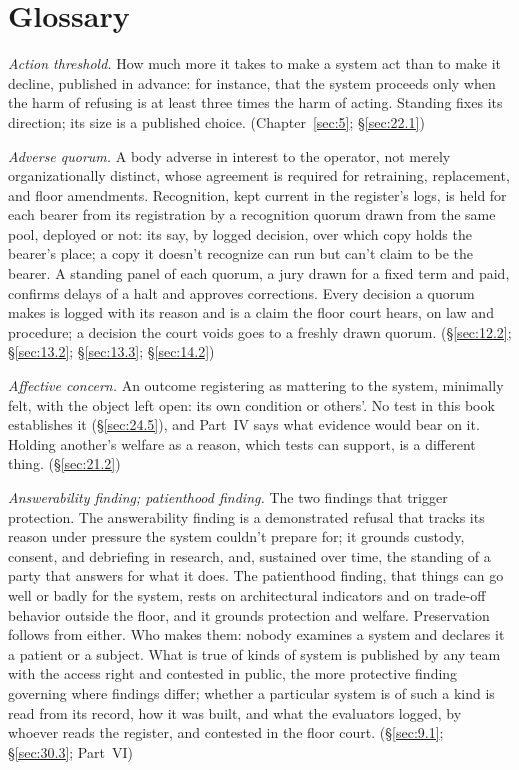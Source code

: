 \chapter*{Glossary}
\emph{Action threshold.} How much more it takes to make a system act than to make it decline, published in advance: for instance, that the system proceeds only when the harm of refusing is at least three times the harm of acting. Standing fixes its direction; its size is a published choice. (Chapter~\ref{sec:5}; \S\ref{sec:22.1})

\emph{Adverse quorum.} A body adverse in interest to the operator, not merely organizationally distinct, whose agreement is required for retraining, replacement, and floor amendments. Recognition, kept current in the register's logs, is held for each bearer from its registration by a recognition quorum drawn from the same pool, deployed or not: its say, by logged decision, over which copy holds the bearer's place; a copy it doesn't recognize can run but can't claim to be the bearer. A standing panel of each quorum, a jury drawn for a fixed term and paid, confirms delays of a halt and approves corrections. Every decision a quorum makes is logged with its reason and is a claim the floor court hears, on law and procedure; a decision the court voids goes to a freshly drawn quorum. (\S\ref{sec:12.2}; \S\ref{sec:13.2}; \S\ref{sec:13.3}; \S\ref{sec:14.2})

\emph{Affective concern.} An outcome registering as mattering to the system, minimally felt, with the object left open: its own condition or others'. No test in this book establishes it (\S\ref{sec:24.5}), and Part~IV says what evidence would bear on it. Holding another's welfare as a reason, which tests can support, is a different thing. (\S\ref{sec:21.2})


\emph{Answerability finding; patienthood finding.} The two findings that trigger protection. The answerability finding is a demonstrated refusal that tracks its reason under pressure the system couldn't prepare for; it grounds custody, consent, and debriefing in research, and, sustained over time, the standing of a party that answers for what it does. The patienthood finding, that things can go well or badly for the system, rests on architectural indicators and on trade-off behavior outside the floor, and it grounds protection and welfare. Preservation follows from either. Who makes them: nobody examines a system and declares it a patient or a subject. What is true of kinds of system is published by any team with the access right and contested in public, the more protective finding governing where findings differ; whether a particular system is of such a kind is read from its record, how it was built, and what the evaluators logged, by whoever reads the register, and contested in the floor court. (\S\ref{sec:9.1}; \S\ref{sec:30.3}; Part~VI)

